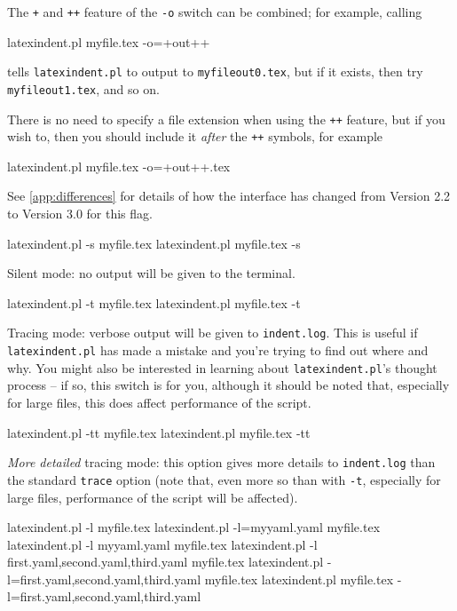 The \texttt{+} and \texttt{++} feature of the \texttt{-o} switch can be combined; for example, calling
	\begin{commandshell}
latexindent.pl myfile.tex -o=+out++
\end{commandshell}
tells \texttt{latexindent.pl} to output to \texttt{myfileout0.tex}, but if it exists, then 
try \texttt{myfileout1.tex}, and so on.

There is no need to specify a file extension when using the \texttt{++} feature, but if you wish to, 
then you should include it \emph{after} the \texttt{++} symbols, for example
	\begin{commandshell}
latexindent.pl myfile.tex -o=+out++.tex
\end{commandshell}

	See \vref{app:differences} for details of how the interface has changed
	from Version 2.2 to Version 3.0 for this flag.
	\begin{commandshell}
latexindent.pl -s myfile.tex
latexindent.pl myfile.tex -s
      \end{commandshell}

	Silent mode: no output will be given to the terminal.

	\begin{commandshell}
latexindent.pl -t myfile.tex
latexindent.pl myfile.tex -t
      \end{commandshell}

	\label{page:traceswitch}
	Tracing mode: verbose output will be given to \texttt{indent.log}. This
	is useful if \texttt{latexindent.pl} has made a mistake and you're
	trying to find out where and why. You might also be interested in learning
	about \texttt{latexindent.pl}'s thought process -- if so, this
	switch is for you, although it should be noted that, especially for large files, this does affect
	performance of the script.

	\begin{commandshell}
latexindent.pl -tt myfile.tex
latexindent.pl myfile.tex -tt
      \end{commandshell}

	\emph{More detailed} tracing mode: this option gives more details to \texttt{indent.log}
	than the standard \texttt{trace} option (note that, even more so than with \texttt{-t},
	especially for large files, performance of the script will be affected).

	\begin{commandshell}
latexindent.pl -l myfile.tex
latexindent.pl -l=myyaml.yaml myfile.tex
latexindent.pl -l myyaml.yaml myfile.tex
latexindent.pl -l first.yaml,second.yaml,third.yaml myfile.tex
latexindent.pl -l=first.yaml,second.yaml,third.yaml myfile.tex
latexindent.pl myfile.tex -l=first.yaml,second.yaml,third.yaml 
      \end{commandshell}

